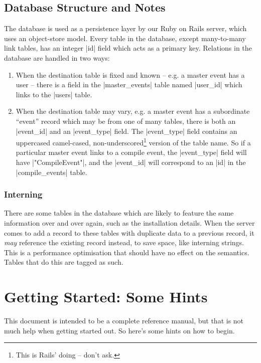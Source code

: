 \documentclass{report}
\begin{document}
\section{Database Structure and Notes}
\label{sec:assoc}

The database is used as a persistence layer by our Ruby on Rails server, which
uses an object-store model.  Every table in the database, except many-to-many link tables, has an
integer |id| field which acts as a primary key.  Relations in the database are
handled in two ways:

\begin{enumerate}
\item When the destination table is fixed and known -- e.g. a master event has a user --
  there is a field in the |master_events| table named |user_id| which links to
  the |users| table.
\item When the destination table may vary, e.g. a master event has a subordinate
  ``event'' record which may be from one of many tables, there is both an
  |event_id| and an |event_type| field.  The |event_type| field contains an
  uppercased camel-cased, non-underscored\footnote{This is Rails' doing -- don't ask.} version
  of the table name.  So if a particular master event links to a compile
  event, the |event_type| field will have |"CompileEvent"|, and the |event_id|
  will correspond to an |id| in the |compile_events| table.
\end{enumerate}

\subsection{Interning}
\label{def:intern}

There are some tables in the database which are likely to feature the same
information over and over again, such as the installation details.  When the
server comes to add a record to these tables with duplicate data to a previous
record, it \textit{may} reference the existing record instead, to save space, like
interning strings.  This is a performance optimisation that should have no
effect on the semantics.  Tables that do this are tagged as such.


\chapter{Getting Started: Some Hints}
\label{sec:getting_started}

This document is intended to be a complete reference manual, but that is not much
help when getting started out.  So here's some hints on how to begin.
\end{document}
